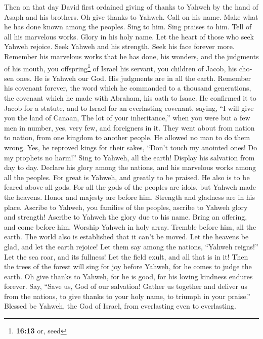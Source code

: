 \begin{paracol}{2}
\begin{otherlanguage}{english}
 Then on that day David first ordained giving of thanks to
Yahweh by the hand of Asaph and his brothers.  Oh give
thanks to Yahweh. Call on his name. Make what he has done known among
the peoples.  Sing to him. Sing praises to him. Tell of
all his marvelous works.  Glory in his holy name. Let the
heart of those who seek Yahweh rejoice.  Seek Yahweh and
his strength. Seek his face forever more.  Remember his
marvelous works that he has done, his wonders, and the judgments of his
mouth,  you offspring\footnote{\textbf{16:13} or, seed}
of Israel his servant, you children of Jacob, his chosen ones.
 He is Yahweh our God. His judgments are in all the
earth.  Remember his covenant forever, the word which he
commanded to a thousand generations,  the covenant which
he made with Abraham, his oath to Isaac.  He confirmed it
to Jacob for a statute, and to Israel for an everlasting covenant,
 saying, ``I will give you the land of Canaan, The lot of
your inheritance,''  when you were but a few men in
number, yes, very few, and foreigners in it.  They went
about from nation to nation, from one kingdom to another people.
 He allowed no man to do them wrong. Yes, he reproved
kings for their sakes,  ``Don't touch my anointed ones!
Do my prophets no harm!''  Sing to Yahweh, all the earth!
Display his salvation from day to day.  Declare his glory
among the nations, and his marvelous works among all the peoples.
 For great is Yahweh, and greatly to be praised. He also
is to be feared above all gods.  For all the gods of the
peoples are idols, but Yahweh made the heavens.  Honor
and majesty are before him. Strength and gladness are in his place.
 Ascribe to Yahweh, you families of the peoples, ascribe
to Yahweh glory and strength!  Ascribe to Yahweh the
glory due to his name. Bring an offering, and come before him. Worship
Yahweh in holy array.  Tremble before him, all the earth.
The world also is established that it can't be moved. 
Let the heavens be glad, and let the earth rejoice! Let them say among
the nations, ``Yahweh reigns!''  Let the sea roar, and
its fullness! Let the field exult, and all that is in it!
 Then the trees of the forest will sing for joy before
Yahweh, for he comes to judge the earth.  Oh give thanks
to Yahweh, for he is good, for his loving kindness endures forever.
 Say, ``Save us, God of our salvation! Gather us together
and deliver us from the nations, to give thanks to your holy name, to
triumph in your praise.''  Blessed be Yahweh, the God of
Israel, from everlasting even to everlasting.


\end{otherlanguage}
\end{paracol}
